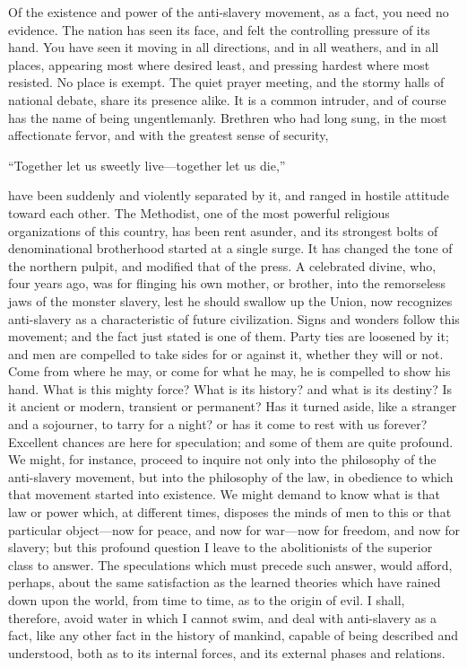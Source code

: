 Of the existence and power of the anti-slavery movement, as a fact, you
need no evidence. The nation has seen its face, and felt the controlling
pressure of its hand. You have seen it moving in all directions, and in
all weathers, and in all places, appearing most where desired least, and
pressing hardest where most resisted. No place is exempt. The quiet
prayer meeting, and the stormy halls of national debate, share its
presence alike. It is a common intruder, and of course has the name of
being ungentlemanly. Brethren who had long sung, in the most
affectionate fervor, and with the greatest sense of security,

``Together let us sweetly live---together let us die,''

have been suddenly and violently separated by it, and ranged in hostile
attitude toward each other. The Methodist, one of the most powerful
religious organizations of this country, has been rent asunder, and its
strongest bolts of denominational brotherhood started at a single surge.
It has changed the tone of the northern pulpit, and modified that of the
press. A celebrated divine, who, four years ago, was for flinging his
own mother, or brother, into the remorseless jaws of the monster
slavery, lest he should swallow up the Union, now recognizes
anti-slavery as a characteristic of future civilization. Signs and
wonders follow this movement; and the fact just stated is one of them.
Party ties are loosened by it; and men are compelled to take sides for
or against it, whether they will or not. Come from where he may, or come
for what he may, he is compelled to show his hand. What is this mighty
force? What is its history? and what is its destiny? Is it ancient or
modern, transient or permanent? Has it turned aside, like a stranger and
a sojourner, to tarry for a night? or has it come to rest with us
forever? Excellent chances are here for speculation; and some of them
are quite profound. We might, for instance, proceed to inquire not
{}only into the philosophy of the anti-slavery movement, but into the
philosophy of the law, in obedience to which that movement started into
existence. We might demand to know what is that law or power which, at
different times, disposes the minds of men to this or that particular
object---now for peace, and now for war---now for freedom, and now for
slavery; but this profound question I leave to the abolitionists of the
superior class to answer. The speculations which must precede such
answer, would afford, perhaps, about the same satisfaction as the
learned theories which have rained down upon the world, from time to
time, as to the origin of evil. I shall, therefore, avoid water in which
I cannot swim, and deal with anti-slavery as a fact, like any other fact
in the history of mankind, capable of being described and understood,
both as to its internal forces, and its external phases and relations.

